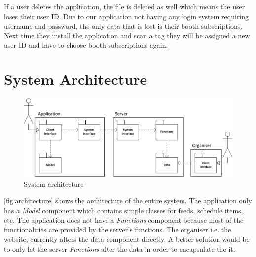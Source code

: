 If a user deletes the application, the file is deleted as well which means the user loses their user ID. Due to our application not having any login system requiring username and password, the only data that is lost is their booth subscriptions. Next time they install the application and scan a tag they will be assigned a new user ID and have to choose booth subscriptions again.

\section{System Architecture}

\begin{figure}[H]
\centering
\includegraphics[width=\linewidth]{img/components.pdf}
\caption{System architecture\label{fig:architecture}}
\end{figure}

\autoref{fig:architecture} shows the architecture of the entire system. The application only has a \textit{Model} component which contains simple classes for feeds, schedule items, etc. The application does not have a \textit{Functions} component because most of the functionalities are provided by the server's functions. The organiser i.e. the website, currently alters the data component directly. A better solution would be to only let the server \textit{Functions} alter the data in order to encapsulate the it.
